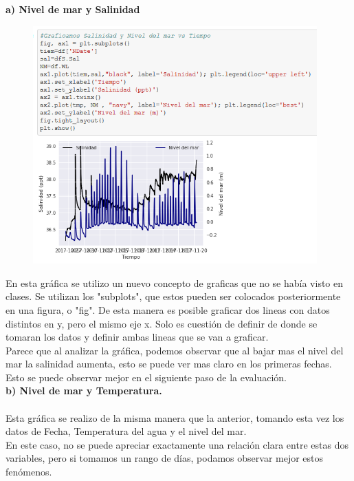 \documentclass[12pt]{article}
\begin{document}
\noindent\textbf {a) Nivel de mar y Salinidad}
\begin{figure}[h!]
    \centering
\includegraphics[width=4.3in]{SP1.png}
\end{figure}

En esta gráfica se utilizo un nuevo concepto de graficas que no se había visto en clases. Se utilizan los "subplots", que estos pueden ser colocados posteriormente en una figura, o "fig". De esta manera es posible graficar dos lineas con datos distintos en y, pero el mismo eje x. Solo es cuestión de definir de donde se tomaran los datos y definir ambas lineas que se van a graficar. \\

Parece que al analizar la gráfica, podemos observar que al bajar mas el nivel del mar la salinidad aumenta, esto se puede ver mas claro en los primeras fechas. Esto se puede observar mejor en el siguiente paso de la evaluación. \\

\noindent\textbf {b) Nivel de mar y Temperatura.} \\ \\
Esta gráfica se realizo de la misma manera que la anterior, tomando esta vez los datos de Fecha, Temperatura del agua y el nivel del mar. \\

En este caso, no se puede apreciar exactamente una relación clara entre estas dos variables, pero si tomamos un rango de días, podamos observar mejor estos fenómenos. \\ \\ \\ \\ \\ \\ \\ \\ \\ \\ \\ \\
\end{document}
